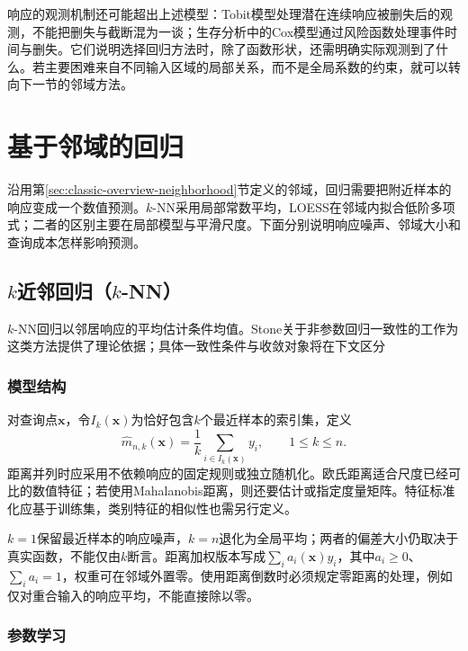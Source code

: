 响应的观测机制还可能超出上述模型：Tobit模型处理潜在连续响应被删失后的观测，不能把删失与截断混为一谈；生存分析中的Cox模型通过风险函数处理事件时间与删失。它们说明选择回归方法时，除了函数形状，还需明确实际观测到了什么。若主要困难来自不同输入区域的局部关系，而不是全局系数的约束，就可以转向下一节的邻域方法。

\section{基于邻域的回归}
\label{sec:regression-instance}

沿用第\ref{sec:classic-overview-neighborhood}节定义的邻域，回归需要把附近样本的响应变成一个数值预测。$k$-NN采用局部常数平均，LOESS在邻域内拟合低阶多项式；二者的区别主要在局部模型与平滑尺度。下面分别说明响应噪声、邻域大小和查询成本怎样影响预测。

\subsection{$k$近邻回归（$k$-NN）}
\label{sec:regression-knn}

$k$-NN回归以邻居响应的平均估计条件均值。Stone关于非参数回归一致性的工作为这类方法提供了理论依据；具体一致性条件与收敛对象将在下文区分

\subsubsection{模型结构}

对查询点$\bm{x}$，令$I_k(\bm{x})$为恰好包含$k$个最近样本的索引集，定义
\begin{equation}
  \widehat m_{n,k}(\bm{x})=\frac1k\sum_{i\in I_k(\bm{x})}y_i,
  \qquad 1\leq k\leq n.
  \label{eq:regression-knn}
\end{equation}
距离并列时应采用不依赖响应的固定规则或独立随机化。欧氏距离适合尺度已经可比的数值特征；若使用Mahalanobis距离，则还要估计或指定度量矩阵。特征标准化应基于训练集，类别特征的相似性也需另行定义。

$k=1$保留最近样本的响应噪声，$k=n$退化为全局平均；两者的偏差大小仍取决于真实函数，不能仅由$k$断言。距离加权版本写成$\sum_i a_i(\bm{x})y_i$，其中$a_i\geq0$、$\sum_i a_i=1$，权重可在邻域外置零。使用距离倒数时必须规定零距离的处理，例如仅对重合输入的响应平均，不能直接除以零。

\subsubsection{参数学习}

